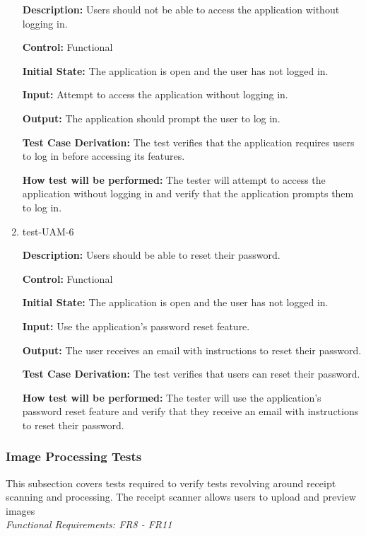 \documentclass[12pt, titlepage]{article}
\begin{document}
\begin{enumerate}
\textbf{Description:} Users should not be able to access the application without
logging in.

\textbf{Control:} Functional

\textbf{Initial State:} The application is open and the user has not logged in.

\textbf{Input:} Attempt to access the application without logging in.

\textbf{Output:} The application should prompt the user to log in.

\textbf{Test Case Derivation:} The test verifies that the application requires
users to log in before accessing its features.

\textbf{How test will be performed:} The tester will attempt to access the
application without logging in and verify that the application prompts them to log
in.

\item{test-UAM-6}

\textbf{Description:} Users should be able to reset their password.

\textbf{Control:} Functional

\textbf{Initial State:} The application is open and the user has not logged in.

\textbf{Input:} Use the application's password reset feature.

\textbf{Output:} The user receives an email with instructions to reset their password.

\textbf{Test Case Derivation:} The test verifies that users can reset their
password.

\textbf{How test will be performed:} The tester will use the application's
password reset feature and verify that they receive an email with instructions
to reset their password.

\end{enumerate}

\subsubsection{Image Processing Tests}

This subsection covers tests required to verify tests revolving around receipt scanning and processing. The receipt scanner allows users to upload and preview images\\
\textit{Functional Requirements: FR8 - FR11}
\end{document}
